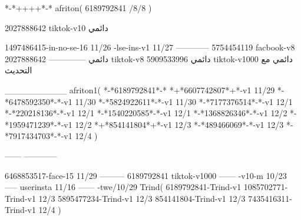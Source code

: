 *-*++++*-*
afriton(
6189792841 /8/8
)

2027888642 tiktok-v10
دائمي

1497486415-in-no-se-16 11/26
-lse-ins-v1 11/27
------------
5754454119 facbook-v8
دائمي
--------------
2027888642 tiktok-v8
دائمي
5909533996 tiktok-v1000
دائمي مع التحديث

__________
afriton1(
*-*6189792841*-*
*+*6607742807*+*-v1 11/29
*-*6478592350*-*-v1 11/30
*-*5824922611*-*-v1 11/30
*-*7177376514*-*-v1 12/1
*-*220218136*-*-v1 12/1
*-*1540220585*-*-v1 12/1
*-*1368826346*-*-v1 12/2
*-*1959471239*-*-v1 12/2
*+*854141804*+*-v1 12/3
*-*489466069*-*-v1 12/3
*-*7917434703*-*-v1 12/4
)

------
------------

6468853517-face-15 11/29
---------
6189792841 tiktok-v1000
------
-v10-m 10/23
-----
userinsta 11/16
------
-twe/10/29
Trind(
6189792841-Trind-v1 
1085702771-Trind-v1 12/3
5895477234-Trind-v1 12/3
854141804-Trind-v1 12/3
7435416311-Trind-v1 12/4
)
